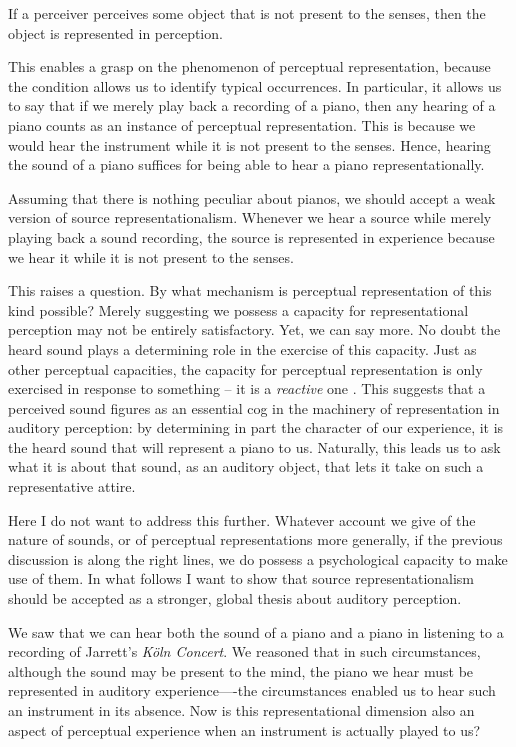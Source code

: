 \documentclass[sloppy, journal, git, bytitle, dodraft]{humapap}
\begin{document}
\begin{description}
 If a perceiver perceives some object that is not present to the senses,
then the object is represented in perception.
\end{description}

This enables a grasp on the phenomenon of perceptual representation,
because the condition allows us to identify typical occurrences. In
particular, it allows us to say that if we merely play back a recording
of a piano, then any hearing of a piano counts as an instance of
perceptual representation. This is because we would hear the instrument
while it is not present to the senses. Hence, hearing the sound of a
piano suffices for being able to hear a piano representationally.

Assuming that there is nothing peculiar about pianos, we should accept a
weak version of source representationalism. Whenever we hear a source
while merely playing back a sound recording, the source is represented
in experience because we hear it while it is not present to the senses.

This raises a question. By what mechanism is perceptual representation
of this kind possible? Merely suggesting we possess a capacity for
representational perception may not be entirely satisfactory. Yet, we
can say more. No doubt the heard sound plays a determining role in the
exercise of this capacity. Just as other perceptual capacities, the
capacity for perceptual representation is only exercised in response to
something -- it is a \emph{reactive} one
\autocite[cf.][]{kalderon2014aa}. This suggests that a perceived sound
figures as an essential cog in the machinery of representation in
auditory perception: by determining in part the character of our
experience, it is the heard sound that will represent a piano to us.
Naturally, this leads us to ask what it is about that sound, as an
auditory object, that lets it take on such a representative attire.

Here I do not want to address this further. Whatever account we give of
the nature of sounds, or of perceptual representations more generally,
if the previous discussion is along the right lines, we do possess a
psychological capacity to make use of them. In what follows I want to
show that source representationalism should be accepted as a stronger,
global thesis about auditory perception.



\sect We saw that we can hear both the sound of a piano and a piano in
listening to a recording of Jarrett's \emph{Köln Concert}. We reasoned
that in such circumstances, although the sound may be present to the
mind, the piano we hear must be represented in auditory
experience----the circumstances enabled us to hear such an instrument in
its absence. Now is this representational dimension also an aspect of
perceptual experience when an instrument is actually played to us?
\end{document}
